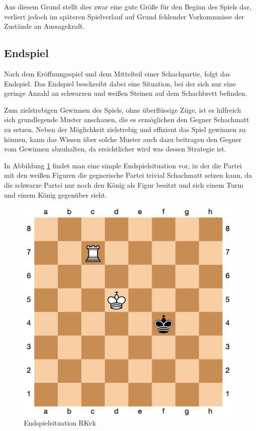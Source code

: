 Aus diesem Grund stellt dies zwar eine gute Größe für den Beginn des Spiels dar, verliert jedoch im späteren Spielverlauf auf Grund fehlender Vorkommnisse der Zustände an Aussagekraft.


\subsection{Endspiel}\label{finishing_evaluation}
Nach dem Eröffnungsspiel und dem Mittelteil einer Schachpartie, folgt das Endspiel. Das Endspiel beschreibt dabei eine Situation, bei der sich nur eine geringe Anzahl an schwarzen und weißen Steinen auf dem Schachbrett befinden. 

Zum zielstrebigen Gewinnen des Spiels, ohne überflüssige Züge, ist es hilfreich sich grundlegende Muster anschauen, die es ermöglichen den Gegner Schachmatt zu setzen. Neben der Möglichkeit zielstrebig und effizient das Spiel gewinnen zu können, kann das Wissen über solche Muster auch dazu beitragen den Gegner vom Gewinnen abzuhalten, da ersichtlicher wird was dessen Strategie ist.

In Abbildung \ref{fig:RKvk} findet man eine simple Endspielsituation vor, in der die Partei mit den weißen Figuren die gegnerische Partei trivial Schachmatt setzen kann, da die schwarze Partei nur noch den König als Figur besitzt und sich einem Turm und einem König gegenüber sieht.

\begin{figure}[h]
\centering
\includegraphics[width=\textwidth/5*4]{images/RKvk.png}

\caption{Endspielsituation RKvk}\label{fig:RKvk}
\end{figure}

